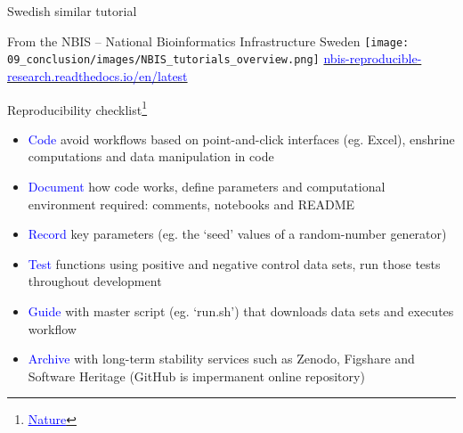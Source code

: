 \begin{frame}{Swedish similar tutorial}
\begin{center}
From the NBIS -- National Bioinformatics Infrastructure Sweden
    \texttt{[image: 09\_conclusion/images/NBIS\_tutorials\_overview.png]}
    \href{https://nbis-reproducible-research.readthedocs.io/en/latest/}{\textcolor{blue}{nbis-reproducible-research.readthedocs.io/en/latest}}
\end{center}
\end{frame}
\begin{frame}{Reproducibility checklist\footnote{\href{https://www.nature.com/articles/d41586-020-02462-7}{\textcolor{blue}{\underline{Nature}}}}}

\begin{itemize}
    \item \textcolor{blue}{Code} avoid workflows based on point-and-click interfaces (eg. Excel), enshrine computations and data manipulation in code
    \item \textcolor{blue}{Document} how code works, define parameters and computational environment required: comments, notebooks and README
    \item \textcolor{blue}{Record} key parameters (eg. the ‘seed’ values of a random-number generator)
    \item \textcolor{blue}{Test} functions using positive and negative control data sets, run those tests throughout development
    \item \textcolor{blue}{Guide} with master script (eg. ‘run.sh’) that downloads data sets and executes workflow
    \item \textcolor{blue}{Archive} with long-term stability services such as Zenodo, Figshare and Software Heritage (GitHub is impermanent online repository)
\end{itemize}
\end{frame}

